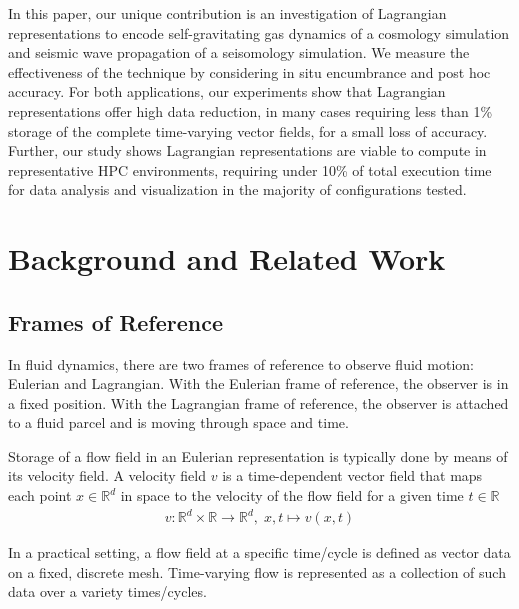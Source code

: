 \documentclass[runningheads]{llncs}
\begin{document}
In this paper, our unique contribution is an investigation of Lagrangian representations to encode self-gravitating gas dynamics of a cosmology simulation and seismic wave propagation of a seisomology simulation.
%
We measure the effectiveness of the technique by considering in situ encumbrance and post hoc accuracy.
%
For both applications, our experiments show that Lagrangian representations offer high data reduction, in many cases requiring less than 1\% storage of the complete time-varying vector fields, for a small loss of accuracy.
%
Further, our study shows Lagrangian representations are viable to compute in representative HPC environments, requiring under 10\% of total execution time for data analysis and visualization in the majority of configurations tested.

\vspace{-2mm}
\section{Background and Related Work}
\label{sec:related}
\vspace{-1mm}
\subsection{Frames of Reference}
\setlength{\belowdisplayskip}{3pt} \setlength{\belowdisplayshortskip}{3pt}
\setlength{\abovedisplayskip}{3pt} \setlength{\abovedisplayshortskip}{3pt}
%
In fluid dynamics, there are two frames of reference to observe fluid motion: Eulerian and Lagrangian.
%
With the Eulerian frame of reference, the observer is in a fixed position.
%
With the Lagrangian frame of reference, the observer is attached to a fluid parcel and is moving through space and time.

%
Storage of a flow field in an Eulerian representation is typically done by means of its velocity field.
%
A velocity field $v$ is a time-dependent vector field that maps each point $x\in \mathbb R^d$ in space to the velocity of the flow field for a given time $t\in \mathbb R$
%
\begin{eqnarray}
{v} : \mathbb R^d \times \mathbb R \to \mathbb R^d,\; x,t \mapsto v(x,t)
\end{eqnarray}

%
In a practical setting, a flow field at a specific time/cycle is defined as vector data on a fixed, discrete mesh.
%
Time-varying flow is represented as a collection of such data over a variety times/cycles.
\end{document}
